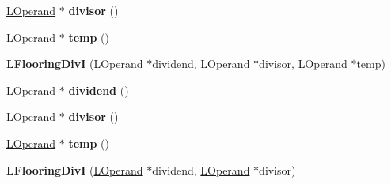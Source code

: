 \begin{DoxyCompactItemize}
\item 
\hyperlink{classv8_1_1internal_1_1_l_operand}{L\+Operand} $\ast$ {\bfseries divisor} ()\hypertarget{classv8_1_1internal_1_1_l_flooring_div_i_a08339949c5e8e7eeaaa718262a80085f}{}\label{classv8_1_1internal_1_1_l_flooring_div_i_a08339949c5e8e7eeaaa718262a80085f}

\item 
\hyperlink{classv8_1_1internal_1_1_l_operand}{L\+Operand} $\ast$ {\bfseries temp} ()\hypertarget{classv8_1_1internal_1_1_l_flooring_div_i_a2bf7b47423b702a7916cf167bcbd322d}{}\label{classv8_1_1internal_1_1_l_flooring_div_i_a2bf7b47423b702a7916cf167bcbd322d}

\item 
{\bfseries L\+Flooring\+DivI} (\hyperlink{classv8_1_1internal_1_1_l_operand}{L\+Operand} $\ast$dividend, \hyperlink{classv8_1_1internal_1_1_l_operand}{L\+Operand} $\ast$divisor, \hyperlink{classv8_1_1internal_1_1_l_operand}{L\+Operand} $\ast$temp)\hypertarget{classv8_1_1internal_1_1_l_flooring_div_i_ac86b4e7af079084e1bf5758a9c9ecef1}{}\label{classv8_1_1internal_1_1_l_flooring_div_i_ac86b4e7af079084e1bf5758a9c9ecef1}

\item 
\hyperlink{classv8_1_1internal_1_1_l_operand}{L\+Operand} $\ast$ {\bfseries dividend} ()\hypertarget{classv8_1_1internal_1_1_l_flooring_div_i_aa8325f9821019c14c21d3db92a6e27bb}{}\label{classv8_1_1internal_1_1_l_flooring_div_i_aa8325f9821019c14c21d3db92a6e27bb}

\item 
\hyperlink{classv8_1_1internal_1_1_l_operand}{L\+Operand} $\ast$ {\bfseries divisor} ()\hypertarget{classv8_1_1internal_1_1_l_flooring_div_i_a08339949c5e8e7eeaaa718262a80085f}{}\label{classv8_1_1internal_1_1_l_flooring_div_i_a08339949c5e8e7eeaaa718262a80085f}

\item 
\hyperlink{classv8_1_1internal_1_1_l_operand}{L\+Operand} $\ast$ {\bfseries temp} ()\hypertarget{classv8_1_1internal_1_1_l_flooring_div_i_a2bf7b47423b702a7916cf167bcbd322d}{}\label{classv8_1_1internal_1_1_l_flooring_div_i_a2bf7b47423b702a7916cf167bcbd322d}

\item 
{\bfseries L\+Flooring\+DivI} (\hyperlink{classv8_1_1internal_1_1_l_operand}{L\+Operand} $\ast$dividend, \hyperlink{classv8_1_1internal_1_1_l_operand}{L\+Operand} $\ast$divisor)\hypertarget{classv8_1_1internal_1_1_l_flooring_div_i_a88e21c324c7b5a3f91e6139b24c0301f}{}\label{classv8_1_1internal_1_1_l_flooring_div_i_a88e21c324c7b5a3f91e6139b24c0301f}


\end{DoxyCompactItemize}
